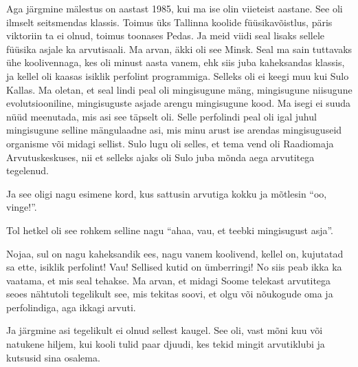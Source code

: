 Aga järgmine mälestus on  aastast 1985, kui ma ise olin viieteist aastane. See oli ilmselt seitsmendas klassis. Toimus üks Tallinna koolide füüsikavõistlus, päris viktoriin ta ei olnud,  toimus toonases Pedas. Ja  meid viidi seal lisaks sellele füüsika asjale ka arvutisaali. Ma arvan, äkki oli see  Minsk. Seal ma sain tuttavaks ühe koolivennaga, kes oli minust aasta vanem, ehk siis juba kaheksandas klassis, ja kellel oli kaasas isiklik perfolint programmiga. Selleks oli ei keegi muu kui Sulo Kallas. Ma oletan, et seal lindi peal oli mingisugune mäng, mingisugune niisugune evolutsiooniline, mingisuguste asjade arengu mingisugune kood. Ma isegi ei suuda nüüd meenutada, mis asi see täpselt oli. Selle perfolindi peal oli igal juhul mingisugune selline mängulaadne asi, mis minu arust ise  arendas mingisuguseid organisme või midagi sellist. Sulo lugu  oli selles, et tema vend oli Raadiomaja Arvutuskeskuses, nii et selleks ajaks oli Sulo juba mõnda aega arvutitega tegelenud. 

Ja see oligi nagu esimene kord, kus sattusin arvutiga kokku ja mõtlesin \enquote{oo, vinge!}.


Tol hetkel  oli see rohkem selline nagu \enquote{ahaa, vau, et teebki mingisugust asja}. 


Nojaa, sul on nagu kaheksandik ees,  nagu vanem koolivend, kellel on,  kujutatad sa ette, isiklik perfolint! Vau! Sellised kutid on ümberringi! No siis peab ikka ka vaatama, et mis seal tehakse. Ma arvan, et  midagi Soome telekast arvutitega seoes nähtutoli tegelikult see, mis tekitas soovi, et olgu või nõukogude oma ja perfolindiga, aga ikkagi arvuti. 

Ja järgmine asi tegelikult ei olnud sellest kaugel. See oli, vast mõni kuu või natukene hiljem, kui kooli tulid paar djuudi, kes tekid mingit arvutiklubi ja kutsusid sina osalema. 

